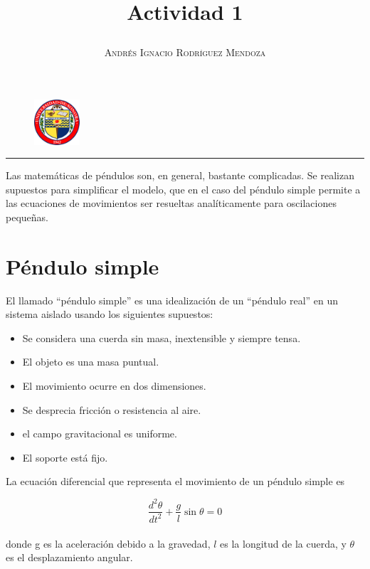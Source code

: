 \documentclass[11pt,spanish]{article}
\title{\vspace{-3cm}\begin{flushleft}\textbf{Actividad 1}\end{flushleft}}
\author{\hspace{-9.6cm}\textsc{Andrés Ignacio Rodríguez Mendoza}}
\date{}
\begin{document}
\begin{figure}
  \begin{center}
   \vspace{-5.2cm} \includegraphics[width=0.15\textwidth]{uni}
  \end{center}
\end{figure}

\maketitle  
\begin{center}
\rule{\textwidth}{1pt}
\end{center}

Las matemáticas de péndulos son, en general, bastante complicadas. Se realizan supuestos para simplificar el modelo, que en el caso del péndulo simple permite a las ecuaciones de movimientos ser resueltas analíticamente para oscilaciones pequeñas.
	






\section*{Péndulo simple}
El llamado  ``péndulo simple'' es una idealización de un ``péndulo real'' en un sistema aislado usando los siguientes supuestos:
\begin{itemize}
	\item Se considera una cuerda sin masa, inextensible y siempre tensa.
	\item El objeto es una masa puntual.
	\item El movimiento ocurre en dos dimensiones.
	\item Se desprecia fricción o resistencia al aire.
	\item el campo gravitacional es uniforme.
	\item El soporte está fijo.
\end{itemize}
La ecuación diferencial que representa el movimiento de un péndulo simple es

\begin{equation}
\frac{d^2\theta}{dt^2} + \frac{g}{l} \sin \theta = 0
\end{equation}\\
donde g es la aceleración debido a la gravedad, $l$ es la longitud de la cuerda, y $\theta$ es el desplazamiento angular.\\
\end{document}
